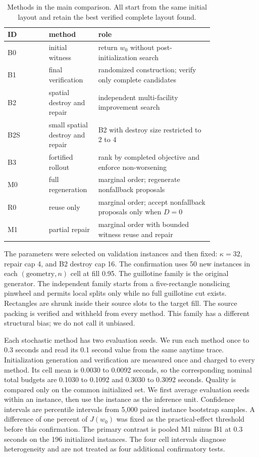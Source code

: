 \documentclass[preprint,12pt,authoryear]{elsarticle}
\newif\iflegacydetails
\begin{document}
\begin{table}[t]
\centering
\caption{Methods in the main comparison. All start from the same initial layout
and retain the best
verified complete layout found.}
\label{tab:sharedmethods}
\small
\begin{tabular}{@{}lp{0.24\linewidth}p{0.57\linewidth}@{}}
\toprule
ID & method & role \\
\midrule
B0 & initial witness & return $w_0$ without post-initialization search \\
B1 & final verification & randomized construction; verify only complete candidates \\
B2 & spatial destroy and repair & independent multi-facility improvement search \\
B2S & small spatial destroy and repair & B2 with destroy size restricted to 2 to 4 \\
B3 & fortified rollout & rank by completed objective and enforce non-worsening \\
M0 & full regeneration & marginal order; regenerate nonfallback proposals \\
R0 & reuse only & marginal order; accept nonfallback proposals only when $D=0$ \\
M1 & partial repair & marginal order with bounded witness reuse and repair \\
\bottomrule
\end{tabular}
\end{table}

\iflegacydetails

The parameters were selected on validation instances and then fixed:
$\kappa=32$, repair cap 4, and B2 destroy cap 16. The confirmation uses 50 new
instances in each $(\text{geometry},n)$ cell at fill 0.95. The guillotine family
is the original generator. The independent family starts from a five-rectangle
nonslicing pinwheel and permits local splits only while no full guillotine cut
exists. Rectangles are shrunk inside their source slots to the target fill. The
source packing is verified and withheld from every method. This family has a
different structural bias; we do not call it unbiased.

Each stochastic method has two evaluation seeds. We run each method once to
0.3 seconds and read its 0.1 second value from the same anytime trace.
Initialization generation and verification are measured once and charged to
every method. Its cell mean is 0.0030 to 0.0092 seconds, so the corresponding
nominal total budgets are 0.1030 to 0.1092 and 0.3030 to 0.3092 seconds. Quality
is compared only on the common initialized set. We first
average evaluation seeds within an instance, then use the instance as the
inference unit. Confidence intervals are percentile intervals from 5,000 paired
instance bootstrap samples. A difference of one percent of $J(w_0)$ was fixed as
the practical-effect threshold before this confirmation. The primary contrast
is pooled M1 minus B1 at 0.3 seconds on the 196 initialized instances. The four
cell intervals diagnose heterogeneity and are not treated as four additional
confirmatory tests.
\end{document}
